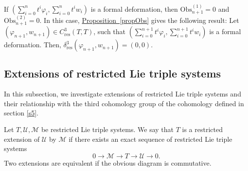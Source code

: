 \documentclass[11pt, twoside]{article}
\begin{document}
If $(\sum\limits_{i=0}^nt^i\varphi_i, \sum\limits_{i=0}^nt^iw_i) $ is a formal deformation, then $\mathrm{Obs}_{n+1}^{(1)}=0$ and $\mathrm{Obs}_{n+1}^{(2)}=0$. In this case, \hyperref[propObs]{Proposition~\ref*{propObs}} gives the following result: Let $(\varphi_{n+1},w_{n+1})\in C^3_\mathrm{res}(T,T) $, such that $(\sum\limits_{i=0}^{n+1}t^i\varphi_i, \sum\limits_{i=0}^{n+1}t^iw_i) $ is a formal deformation. Then, $\delta^3_\mathrm{res}(\varphi_{n+1},w_{n+1})=(0,0)$.

\subsection{Extensions of restricted Lie triple systems}

In this subsection, we investigate extensions of restricted Lie triple systems and their relationship with the third cohomology group of the cohomology defined in section \eqref{s5}.

\begin{defi}
    Let $T,\mathcal{U},\mathcal{M} $ be restricted Lie triple systems. We say that $T$ is a restricted extension of $\mathcal{U}$ by $\mathcal{M}$ if there exists an exact sequence of restricted Lie triple systems $$0\to \mathcal{M}\to T\to \mathcal{U}\to 0. $$ Two extensions are equivalent if the obvious diagram is commutative. 
\end{defi}
\end{document}
